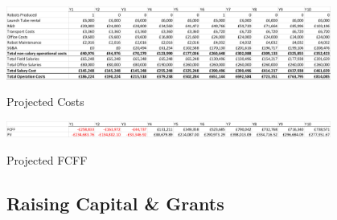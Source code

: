 \documentclass[11pt]{article}		%
\begin{document}
		      	\begin{table}[H]
					\centering
					\includegraphics[width=0.8\textwidth]{Costs_v1}
					\caption{Projected Costs}
					\label{forecast_costs}
				\end{table}
				
		 		\begin{table}[H]
					\centering
					\includegraphics[width=0.8\textwidth]{FCFF_v1}
					\caption{Projected FCFF}
					\label{forecast_FCF}
				\end{table}
				
			 
			    
			    
		\subsection{Raising Capital \& Grants} \label{raisingFunds}
    	    
\end{document}
